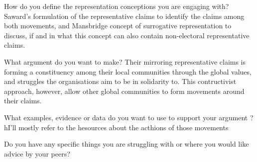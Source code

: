 How do you define the representation conceptions you are engaging with?
Saward's formulation of the representative claims to identify the claims
among both movements, and Mansbridge concept of surrogative
representation to discuss, if and in what this concept can also contain
non-electoral representative claims.

What argument do you want to make?
Their mirroring representative claims is forming a constituency among
their local communities through the global values, and struggles the
organisations aim to be in solidarity to. This contructivist approach,
however, allow other global communities to form movements around their claims.

What examples, evidence or data do you want to use to support your argument ?
hI'll mostly refer to the hesources about the acthions of those movements

Do you have any specific things you are struggling with or where you would like advice by your peers?

\printbibliography

